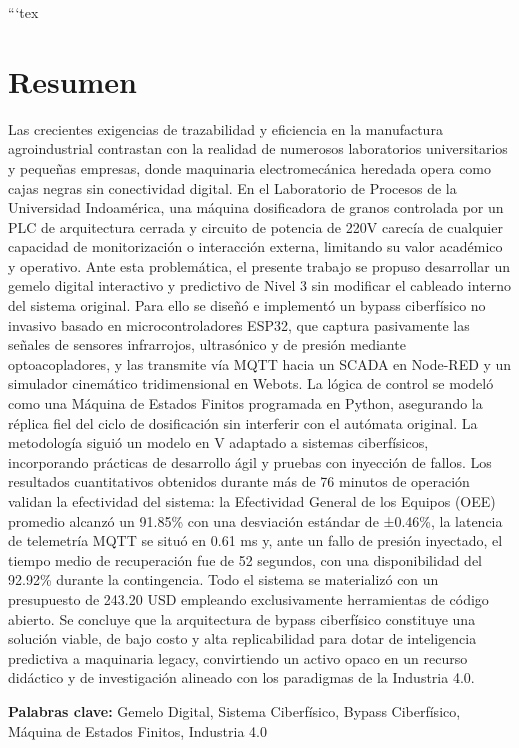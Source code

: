```tex
\chapter*{Resumen}
Las crecientes exigencias de trazabilidad y eficiencia en la manufactura agroindustrial contrastan con la realidad de numerosos laboratorios universitarios y pequeñas empresas, donde maquinaria electromecánica heredada opera como cajas negras sin conectividad digital. En el Laboratorio de Procesos de la Universidad Indoamérica, una máquina dosificadora de granos controlada por un PLC de arquitectura cerrada y circuito de potencia de 220V carecía de cualquier capacidad de monitorización o interacción externa, limitando su valor académico y operativo. Ante esta problemática, el presente trabajo se propuso desarrollar un gemelo digital interactivo y predictivo de Nivel 3 sin modificar el cableado interno del sistema original. Para ello se diseñó e implementó un bypass ciberfísico no invasivo basado en microcontroladores ESP32, que captura pasivamente las señales de sensores infrarrojos, ultrasónico y de presión mediante optoacopladores, y las transmite vía MQTT hacia un SCADA en Node-RED y un simulador cinemático tridimensional en Webots. La lógica de control se modeló como una Máquina de Estados Finitos programada en Python, asegurando la réplica fiel del ciclo de dosificación sin interferir con el autómata original. La metodología siguió un modelo en V adaptado a sistemas ciberfísicos, incorporando prácticas de desarrollo ágil y pruebas con inyección de fallos. Los resultados cuantitativos obtenidos durante más de 76 minutos de operación validan la efectividad del sistema: la Efectividad General de los Equipos (OEE) promedio alcanzó un 91.85\% con una desviación estándar de ±0.46\%, la latencia de telemetría MQTT se situó en 0.61 ms y, ante un fallo de presión inyectado, el tiempo medio de recuperación fue de 52 segundos, con una disponibilidad del 92.92\% durante la contingencia. Todo el sistema se materializó con un presupuesto de 243.20 USD empleando exclusivamente herramientas de código abierto. Se concluye que la arquitectura de bypass ciberfísico constituye una solución viable, de bajo costo y alta replicabilidad para dotar de inteligencia predictiva a maquinaria legacy, convirtiendo un activo opaco en un recurso didáctico y de investigación alineado con los paradigmas de la Industria 4.0.

\textbf{Palabras clave:} Gemelo Digital, Sistema Ciberfísico, Bypass Ciberfísico, Máquina de Estados Finitos, Industria 4.0

